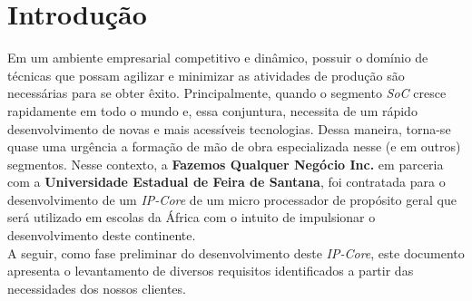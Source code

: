 \section{Introdução}
Em um ambiente empresarial competitivo e dinâmico, possuir o domínio de técnicas que possam agilizar e minimizar as atividades de produção são necessárias para se obter êxito. Principalmente, quando o segmento \textit{SoC} cresce rapidamente em todo o mundo e, essa conjuntura, necessita de um rápido desenvolvimento de novas e mais acessíveis tecnologias. Dessa maneira, torna-se quase uma urgência a formação de mão de obra especializada nesse (e em outros) segmentos. Nesse contexto, a \textbf{Fazemos Qualquer Negócio Inc.} em parceria com a \textbf{Universidade Estadual de Feira de Santana}, foi contratada para o desenvolvimento de um \textit{IP-Core} de um micro processador de propósito geral que será utilizado em escolas da África com o intuito de impulsionar o desenvolvimento deste continente. \\
A seguir, como fase preliminar do desenvolvimento deste \textit{IP-Core}, este documento apresenta o levantamento de diversos requisitos identificados a partir das necessidades dos nossos clientes.